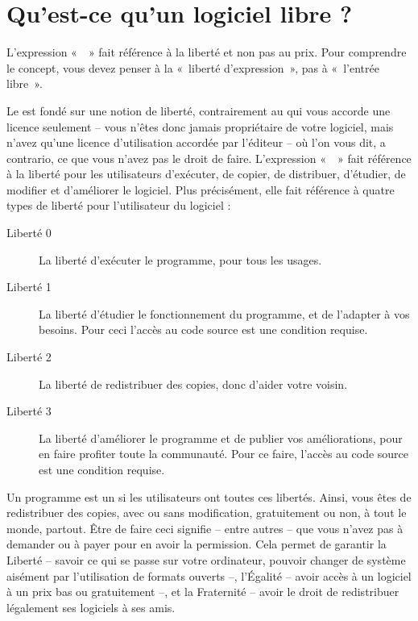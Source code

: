 \section{Qu'est-ce qu'un logiciel libre ?}
L'expression «~~» fait référence à la liberté et non pas au prix. Pour comprendre le concept, vous devez penser à la «~liberté d'expression~», pas à «~l'entrée libre~».\par
Le  est fondé sur une notion de liberté, contrairement au  qui vous accorde une licence seulement -- vous n'êtes donc jamais propriétaire de votre logiciel, mais n'avez qu'une licence d'utilisation accordée par l'éditeur -- où l'on vous dit, a contrario, ce que vous n'avez pas le droit de faire.
L'expression «~~» fait référence à la liberté pour les utilisateurs d'exécuter, de copier, de distribuer, d'étudier, de modifier et d'améliorer le logiciel. Plus précisément, elle fait référence à quatre types de liberté pour l'utilisateur du logiciel :
\begin{description}
\item[Liberté 0] La liberté d'exécuter le programme, pour tous les usages.
\item[Liberté 1] La liberté d'étudier le fonctionnement du programme, et de l'adapter à vos besoins. Pour ceci l'accès au code source est une condition requise.
\item[Liberté 2] La liberté de redistribuer des copies, donc d'aider votre voisin.
\item[Liberté 3] La liberté d'améliorer le programme et de publier vos améliorations, pour en faire profiter toute la communauté. Pour ce faire, l'accès au code source est une condition requise.
\end{description}
Un programme est un  si les utilisateurs ont toutes ces libertés. Ainsi, vous êtes  de redistribuer des copies, avec ou sans modification, gratuitement ou non, à tout le monde, partout. Être  de faire ceci signifie -- entre autres -- que vous n'avez pas à demander ou à payer pour en avoir la permission. Cela permet de garantir la Liberté -- savoir ce qui se passe sur votre ordinateur, pouvoir changer de système aisément par l'utilisation de formats ouverts --, l'Égalité -- avoir accès à un logiciel à un prix bas ou gratuitement --, et la Fraternité -- avoir le droit de redistribuer légalement ses logiciels à ses amis.\par
